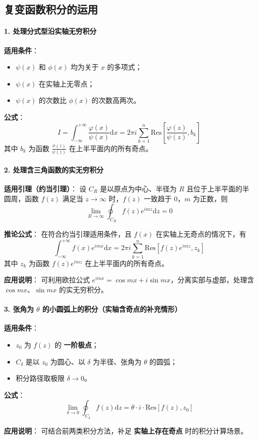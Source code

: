 \documentclass{article}
\begin{document}
	\subsection{复变函数积分的运用}
	\paragraph{1. 处理分式型沿实轴无穷积分}
	\textbf{适用条件}：
	\begin{itemize}[leftmargin=2em, itemsep=0.3em]
		\item $\psi(x)$ 和 $\phi(x)$ 均为关于 $x$ 的多项式；
		\item $\psi(x)$ 在实轴上无零点；
		\item $\psi(x)$ 的次数比 $\phi(x)$ 的次数高两次。
	\end{itemize}
	
	\textbf{公式}：
	\[
	I=\int_{-\infty}^{+\infty}\frac{\varphi(x)}{\psi(x)}\mathrm{d}x=2\pi i\sum_{k=1}^{n}\text{Res}\left[\frac{\varphi(z)}{\psi(z)},b_k\right]
	\]
	其中 $b_k$ 为函数 $\frac{\phi(z)}{\psi(z)}$ 在上半平面内的所有奇点。
	
	\paragraph{2. 处理含三角函数的实无穷积分}
	\textbf{适用引理（约当引理）}：
	设 $C_R$ 是以原点为中心、半径为 $R$ 且位于上半平面的半圆周，函数 $f(z)$ 满足当 $z\to\infty$ 时，$f(z)$ 一致趋于 0，$m$ 为正数，则
	\[
	\lim_{R\to\infty}\oint_{C_R}f(z)e^{imz}\mathrm{d}z = 0
	\]
	
	\textbf{推论公式}：
	在符合约当引理适用条件，且 $f(x)$ 在实轴上无奇点的情况下，有
	\[
	\int_{-\infty}^{+\infty}f(x)e^{imx}\mathrm{d}x=2\pi i\sum_{k=1}^{n}\text{Res}\left[f(z)e^{imz},z_k\right]
	\]
	其中 $z_k$ 为函数 $f(z)e^{imz}$ 在上半平面内的所有奇点。
	
	\textbf{应用说明}：
	可利用欧拉公式 $e^{imx}=\cos mx+i\sin mx$，分离实部与虚部，处理含 $\cos mx$、$\sin mx$ 的实无穷积分。
	
	\paragraph{3. 张角为 $\theta$ 的小圆弧上的积分（实轴含奇点的补充情形）}
	\textbf{适用条件}：
	\begin{itemize}[leftmargin=2em, itemsep=0.3em]
		\item $z_0$ 为 $f(z)$ 的 \textbf{一阶极点}；
		\item $C_\delta$ 是以 $z_0$ 为圆心、以 $\delta$ 为半径、张角为 $\theta$ 的圆弧；
		\item 积分路径取极限 $\delta\to0$。
	\end{itemize}
	
	\textbf{公式}：
	\[
	\lim_{\delta\to0}\oint_{C_\delta}f(z)\mathrm{d}z=\theta\cdot i\cdot\text{Res}\left[f(z),z_0\right]
	\]
	
	\textbf{应用说明}：
	可结合前两类积分方法，补足 \textbf{实轴上存在奇点} 时的积分计算场景。
	
	
	
			
\end{document}
